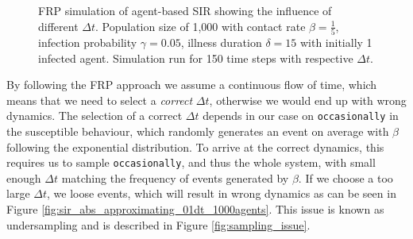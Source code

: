 \begin{figure}
\begin{center}
	\caption[FRP simulation of agent-based SIR showing the influence of different $\Delta t$]{FRP simulation of agent-based SIR showing the influence of different $\Delta t$. Population size of 1,000 with contact rate $\beta = \frac{1}{5}$, infection probability $\gamma = 0.05$, illness duration $\delta = 15$ with initially 1 infected agent. Simulation run for 150 time steps with respective $\Delta t$.} 
	\label{fig:sir_abs_dynamics_frp}
\end{center}
\end{figure}

By following the FRP approach we assume a continuous flow of time, which means that we need to select a \textit{correct} $\Delta t$, otherwise we would end up with wrong dynamics. The selection of a correct $\Delta t$ depends in our case on \texttt{occasionally} in the susceptible behaviour, which randomly generates an event on average with $\beta$ following the exponential distribution. To arrive at the correct dynamics, this requires us to sample \texttt{occasionally}, and thus the whole system, with small enough $\Delta t$ matching the frequency of events generated by $\beta$. If we choose a too large $\Delta t$, we loose events, which will result in wrong dynamics as can be seen in Figure \ref{fig:sir_abs_approximating_01dt_1000agents}. This issue is known as undersampling and is described in Figure \ref{fig:sampling_issue}.

